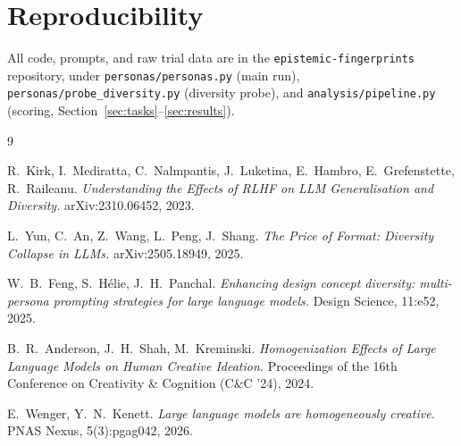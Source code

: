 \documentclass[11pt]{article}
\newcommand{\code}[1]{\texttt{#1}}
\begin{document}
\section*{Reproducibility}
\small
All code, prompts, and raw trial data are in the \code{epistemic-fingerprints} repository, under
\code{personas/personas.py} (main run), \code{personas/probe\_diversity.py} (diversity probe), and
\code{analysis/pipeline.py} (scoring, Section~\ref{sec:tasks}--\ref{sec:results}).
\normalsize

\begin{thebibliography}{9}

R.\ Kirk, I.\ Mediratta, C.\ Nalmpantis, J.\ Luketina, E.\ Hambro, E.\ Grefenstette, R.\ Raileanu.
\emph{Understanding the Effects of RLHF on LLM Generalisation and Diversity.}
arXiv:2310.06452, 2023.

L.\ Yun, C.\ An, Z.\ Wang, L.\ Peng, J.\ Shang.
\emph{The Price of Format: Diversity Collapse in LLMs.}
arXiv:2505.18949, 2025.

W.\ B.\ Feng, S.\ H\'elie, J.\ H.\ Panchal.
\emph{Enhancing design concept diversity: multi-persona prompting strategies for large language
models.}
Design Science, 11:e52, 2025.

B.\ R.\ Anderson, J.\ H.\ Shah, M.\ Kreminski.
\emph{Homogenization Effects of Large Language Models on Human Creative Ideation.}
Proceedings of the 16th Conference on Creativity \& Cognition (C\&C '24), 2024.

E.\ Wenger, Y.\ N.\ Kenett.
\emph{Large language models are homogeneously creative.}
PNAS Nexus, 5(3):pgag042, 2026.

\end{thebibliography}
\end{document}
